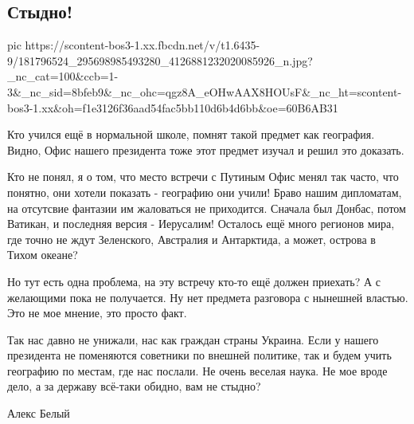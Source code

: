  
 
 
 
 

\subsection{Стыдно!}
\label{sec:03_05_2021.fb.belyj_aleks.1.zelenskii_mesto_vstrechi}

\ifcmt
  pic https://scontent-bos3-1.xx.fbcdn.net/v/t1.6435-9/181796524_295698985493280_4126881232020085926_n.jpg?_nc_cat=100&ccb=1-3&_nc_sid=8bfeb9&_nc_ohc=qgz8A_eOHwAAX8HOUsF&_nc_ht=scontent-bos3-1.xx&oh=f1e3126f36aad54fac5bb110d6b4d6bb&oe=60B6AB31
\fi

Кто учился ещё в нормальной школе, помнят такой предмет как география. Видно,
Офис нашего президента тоже этот предмет изучал и решил это доказать. 

Кто не понял, я о том, что место встречи с Путиным Офис менял так часто, что
понятно, они хотели показать - географию они учили! Браво нашим дипломатам, на
отсутсвие фантазии  им жаловаться не приходится. Сначала был Донбас, потом
Ватикан, и последняя версия - Иерусалим!  Осталось ещё много регионов мира, где
точно не ждут Зеленского, Австралия и Антарктида, а может, острова в Тихом
океане? 

Но тут есть одна проблема, на эту встречу кто-то ещё должен приехать? А с
желающими пока не получается. Ну нет предмета разговора с нынешней властью. Это
не мое мнение, это просто факт.

Так нас давно не унижали, нас как граждан страны Украина.  Если у нашего
президента не поменяются советники по внешней политике, так и будем учить
географию по местам, где нас послали. Не очень веселая наука. Не мое вроде
дело, а за державу всё-таки обидно, вам не стыдно?

Алекс Белый

